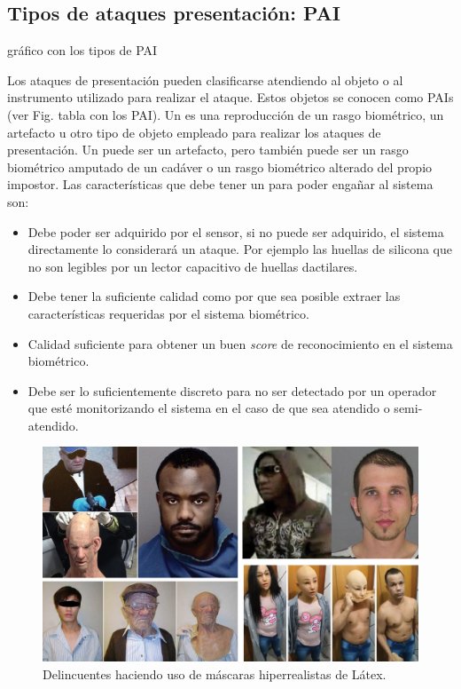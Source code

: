 \subsection{Tipos de ataques presentación: PAI}\label{sec:PAI}

\color{red} gráfico con los tipos de PAI\color{black}

Los ataques de presentación pueden clasificarse atendiendo al objeto o al instrumento utilizado para realizar el ataque. Estos objetos se conocen como \Glspl{PAI} (ver Fig. \color{red}tabla con los PAI\color{black}). Un  es una reproducción de un rasgo biométrico, un artefacto u otro tipo de objeto empleado para realizar los ataques de presentación. Un  puede ser un artefacto, pero también puede ser un rasgo biométrico amputado de un cadáver o un rasgo biométrico alterado del propio impostor. Las características que debe tener un  para poder engañar al sistema son:

\begin{itemize}
\item
Debe poder ser adquirido por el sensor, si no puede ser adquirido, el sistema directamente lo considerará un ataque. Por ejemplo las huellas de silicona que no son legibles por un lector capacitivo de huellas dactilares.

\item
Debe tener la suficiente calidad como por que sea posible extraer las características requeridas por el sistema biométrico.

\item
Calidad suficiente para obtener un buen \textit{score} de reconocimiento en el sistema biométrico.

\item
Debe ser lo suficientemente discreto para no ser detectado por un operador que esté monitorizando el sistema en el caso de que sea atendido o semi-atendido. 
\end{itemize}


\begin{figure}[t]
    \centering
    \includegraphics[width=0.8\linewidth]{ch-sistemasABC/images/ch-SistemasABC/DELITOS_CON_MASCARAS.png}
    \caption{Delincuentes haciendo uso de máscaras hiperrealistas de Látex.}
    \label{fig:DelitosConMascaras}
\end{figure}


